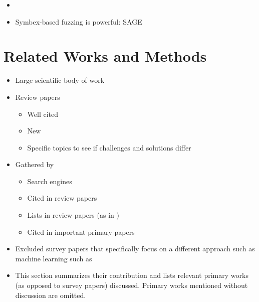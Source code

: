 \documentclass{article}
\begin{document}
\begin{multicols}{2}
\begin{itemize}
\begin{itemize}
                  \item {}\cite{EvaluatingFuzzTesting}
              \end{itemize}
        \item {}\cite{AllYouEverWanted}
        \item Symbex-based fuzzing is powerful: SAGE\cite{SAGE} \cite{FuzzingTheStateOfTheArt}
    \end{itemize}


    \section{Related Works and Methods}
    \label{Methods}
    \begin{itemize}
        \item Large scientific body of work
        \item Review papers
              \begin{itemize}
                  \item Well cited
                  \item New
                  \item Specific topics to see if challenges and solutions differ
              \end{itemize}
        \item Gathered by
              \begin{itemize}
                  \item Search engines
                  \item Cited in review papers
                  \item Lists in review papers (as in \cite{Demystifying})
                  \item Cited in important primary papers
              \end{itemize}
        \item Excluded survey papers that specifically focus on a different approach such as machine learning such as \cite{ML1, ML2}
        \item This section summarizes their contribution and lists relevant primary works (as opposed to survey papers) discussed. Primary works mentioned without discussion are omitted.
    \end{itemize}


\end{multicols}
\end{document}
